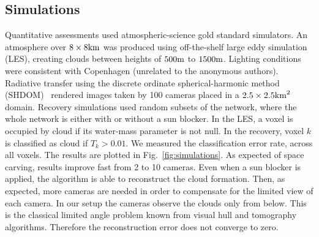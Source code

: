 \documentclass[runningheads]{llncs}
\begin{document}
\subsection*{Simulations}
\label{sec:simulation}

Quantitative assessments used atmospheric-science gold standard simulators.
An atmosphere over $8\times8{\rm km}$  was produced using off-the-shelf large eddy simulation (LES), creating clouds between heights of $500{\rm m}$ to $1500{\rm m}$.
Lighting conditions were consistent with Copenhagen (unrelated to the anonymous authors).
Radiative transfer using the discrete ordinate spherical-harmonic method (SHDOM)~\cite{Evans1998} rendered images taken by 100 cameras placed in a $2.5\times 2.5{\rm km}^2$ domain. Recovery simulations used random subsets
of the network, where the whole network is either with or without
a sun blocker. In the LES, a voxel is occupied by cloud if its water-mass parameter is not null. In the recovery, voxel $k$ is classified as cloud if $T_k>0.01$.
We measured the classification error rate, across all voxels.
The results are plotted in Fig.~\ref{fig:simulations}.  As expected of space carving,
results improve fast from 2 to 10 cameras. Even when a sun blocker is applied,
the algorithm is able to reconstruct the cloud formation. Then, as expected,
more cameras are needed in order to compensate for the limited view of
each camera. In our setup the cameras observe the clouds only from below. This is the classical limited
angle problem known from visual hull and tomography algorithms. Therefore the reconstruction error does not
converge to zero.
\end{document}
